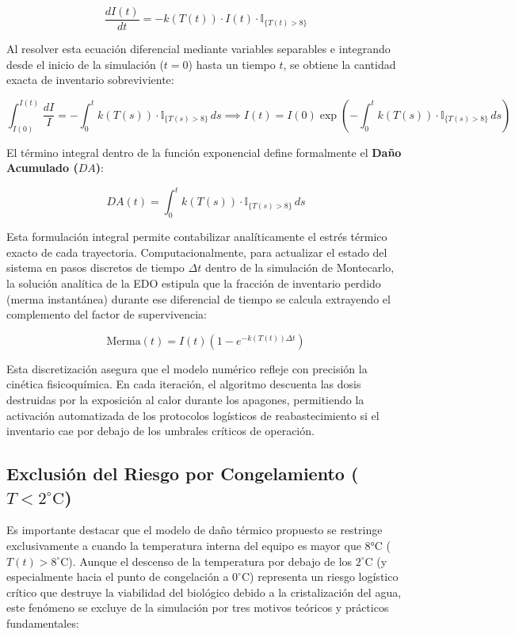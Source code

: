 \documentclass[
  spanish,
  letterpaper,
  DIV=11,
  numbers=noendperiod]{scrreprt}
\theoremstyle{plain}
\theoremstyle{plain}
\theoremstyle{plain}
\theoremstyle{definition}
\theoremstyle{remark}
\begin{document}
\[
\frac{dI(t)}{dt} = -k(T(t)) \cdot I(t) \cdot \mathbb{I}_{\{T(t) > 8\}}
\]

Al resolver esta ecuación diferencial mediante variables separables e
integrando desde el inicio de la simulación (\(t=0\)) hasta un tiempo
\(t\), se obtiene la cantidad exacta de inventario sobreviviente:

\[
\int_{I(0)}^{I(t)} \frac{dI}{I} = - \int_{0}^{t} k(T(s)) \cdot \mathbb{I}_{\{T(s) > 8\}} \, ds \implies I(t) = I(0) \exp\left( - \int_{0}^{t} k(T(s)) \cdot \mathbb{I}_{\{T(s) > 8\}} \, ds \right)
\]

El término integral dentro de la función exponencial define formalmente
el \textbf{Daño Acumulado (\(DA\))}:

\[
DA(t) = \int_{0}^{t} k(T(s)) \cdot \mathbb{I}_{\{T(s) > 8\}} \, ds
\]

Esta formulación integral permite contabilizar analíticamente el estrés
térmico exacto de cada trayectoria. Computacionalmente, para actualizar
el estado del sistema en pasos discretos de tiempo \(\Delta t\) dentro
de la simulación de Montecarlo, la solución analítica de la EDO estipula
que la fracción de inventario perdido (merma instantánea) durante ese
diferencial de tiempo se calcula extrayendo el complemento del factor de
supervivencia:

\[
\text{Merma}(t) = I(t) \left( 1 - e^{-k(T(t)) \Delta t} \right)
\]

Esta discretización asegura que el modelo numérico refleje con precisión
la cinética fisicoquímica. En cada iteración, el algoritmo descuenta las
dosis destruidas por la exposición al calor durante los apagones,
permitiendo la activación automatizada de los protocolos logísticos de
reabastecimiento si el inventario cae por debajo de los umbrales
críticos de operación.

\subsection{\texorpdfstring{Exclusión del Riesgo por Congelamiento
(\(T < 2^\circ\text{C}\))}{Exclusión del Riesgo por Congelamiento (T \textless{} 2\^{}\textbackslash circ\textbackslash text\{C\})}}\label{exclusiuxf3n-del-riesgo-por-congelamiento-t-2circtextc}

Es importante destacar que el modelo de daño térmico propuesto se
restringe exclusivamente a cuando la temperatura interna del equipo es
mayor que 8°C (\(T(t) > 8^\circ\text{C}\)). Aunque el descenso de la
temperatura por debajo de los \(2^\circ\text{C}\) (y especialmente hacia
el punto de congelación a \(0^\circ\text{C}\)) representa un riesgo
logístico crítico que destruye la viabilidad del biológico debido a la
cristalización del agua, este fenómeno se excluye de la simulación por
tres motivos teóricos y prácticos fundamentales:
\end{document}
